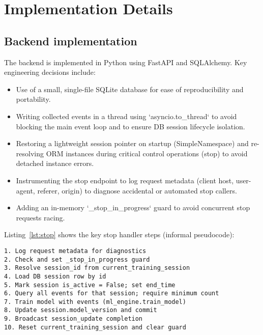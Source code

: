 \documentclass[conference]{IEEEtran}
\begin{document}
\section{Implementation Details}
\subsection{Backend implementation}
The backend is implemented in Python using FastAPI and SQLAlchemy. Key engineering decisions include:
\begin{itemize}[leftmargin=*]
  \item Use of a small, single-file SQLite database for ease of reproducibility and portability.
  \item Writing collected events in a thread using `asyncio.to_thread` to avoid blocking the main event loop and to ensure DB session lifecycle isolation.
  \item Restoring a lightweight session pointer on startup (SimpleNamespace) and re-resolving ORM instances during critical control operations (stop) to avoid detached instance errors.
  \item Instrumenting the stop endpoint to log request metadata (client host, user-agent, referer, origin) to diagnose accidental or automated stop callers.
  \item Adding an in-memory `_stop_in_progress` guard to avoid concurrent stop requests racing.
\end{itemize}

Listing~\ref{lst:stop} shows the key stop handler steps (informal pseudocode):
\begin{lstlisting}[caption={Stop handler (core steps)\label{lst:stop}}]
1. Log request metadata for diagnostics
2. Check and set _stop_in_progress guard
3. Resolve session_id from current_training_session
4. Load DB session row by id
5. Mark session is_active = False; set end_time
6. Query all events for that session; require minimum count
7. Train model with events (ml_engine.train_model)
8. Update session.model_version and commit
9. Broadcast session_update completion
10. Reset current_training_session and clear guard
\end{lstlisting}
\end{document}
